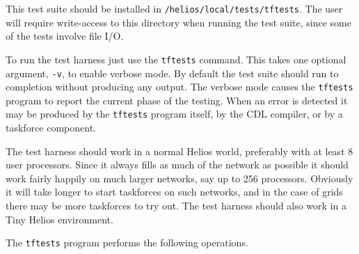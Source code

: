 This test suite should be installed in {\tt /helios/local/tests/tftests}.
The user will require write-access to this directory when running the
test suite, since some of the tests involve file I/O.

To run the test harness just use the {\tt tftests} command. This takes
one optional argument, {\tt -v}, to enable verbose mode. By default
the test suite should run to completion without producing any output.
The verbose mode causes the {\tt tftests} program to report the current
phase of the testing. When an error is detected it may be produced
by the {\tt tftests} program itself, by the CDL compiler, or by a
taskforce component.

The test harness should work in a normal Helios world, preferably with at
least 8 user processors. Since it always fills as much of the network as
possible it should work fairly happily on much larger networks, say up
to 256 processors. Obviously it will take longer to start taskforces
on such networks, and in the case of grids there may be more taskforces
to try out. The test harness should also work in a Tiny Helios environment.

The {\tt tftests} program performs the following operations.

